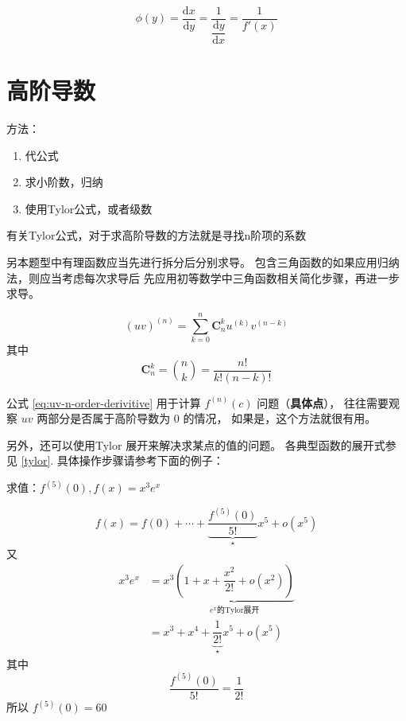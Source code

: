 \begin{lemma}
    \begin{equation}
        \phi (y) = \dfrac{\mbox{d}x}{\mbox{d}y} = \dfrac{1}{\dfrac{\mbox{d}y}{\mbox{d}x}}
                   = \dfrac{1}{f'(x)}
    \end{equation}
\end{lemma}

\section{高阶导数}

方法：
\begin{enumerate}
    \item 代公式
    \item 求小阶数，归纳
    \item 使用Tylor公式，或者级数
\end{enumerate}
有关Tylor公式，对于求高阶导数的方法就是寻找n阶项的系数

另本题型中有理函数应当先进行拆分后分别求导。
包含三角函数的如果应用归纳法，则应当考虑每次求导后
先应用初等数学中三角函数相关简化步骤，再进一步求导。

\begin{lemma}
    \begin{equation}\label{eq:uv-n-order-derivitive}
        (uv)^{(n)} = \sum_{k=0}^{n} \mathbf{C}^{k}_{n} u^{(k)} v^{(n-k)}
    \end{equation}
    其中
    \begin{equation*}
        \mathbf{C}^{k}_{n} = \binom{n}{k} = \dfrac{n!}{k!(n-k)!}
    \end{equation*}
\end{lemma}

公式 \ref{eq:uv-n-order-derivitive} 用于计算 $f^{(n)}(c)$ 问题（\textbf{具体点}），
往往需要观察 $uv$ 两部分是否属于高阶导数为 0 的情况，
如果是，这个方法就很有用。

另外，还可以使用Tylor 展开来解决求某点的值的问题。
各典型函数的展开式参见 \ref{tylor}.
具体操作步骤请参考下面的例子：
\begin{example}
    求值：$f^{(5)}(0), f(x) = x^3 e^x$

    \[
        f(x) = f(0) + \cdots + \underbrace{\dfrac{f^{(5)}(0)}{5!}}_{\star} x^{5} + o(x^5)
    \]
    又
    \begin{align*}
        x^3 e^x &= x^3 \underbrace{(1+x+\dfrac{x^2}{2!} + o(x^2))}_{e^x\mbox{的Tylor展开}} \\
                &= x^3 + x^4 + \underbrace{\dfrac{1}{2!}}_{\star} x^5 + o(x^5)
    \end{align*}
    其中 
    \[
        \dfrac{f^{(5)}(0)}{5!} = \dfrac{1}{2!}
    \]
    所以 $f^{(5)}(0) = 60$
\end{example}

